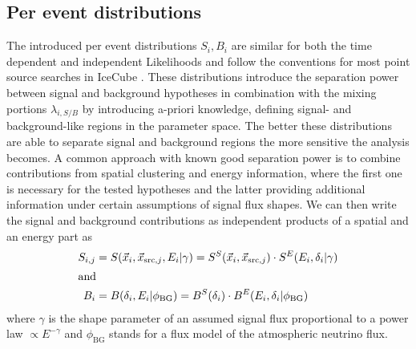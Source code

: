 \subsection{Per event distributions}
The introduced per event distributions $S_i, B_i$ are similar for both the time dependent and independent Likelihoods and follow the conventions for most point source searches in IceCube .
These distributions introduce the separation power between signal and background hypotheses in combination with the mixing portions $\lambda_{i,S/B}$ by introducing a-priori knowledge, defining signal- and background-like regions in the parameter space.
The better these distributions are able to separate signal and background regions the more sensitive the analysis becomes.
A common approach with known good separation power is to combine contributions from spatial clustering and energy information, where the first one is necessary for the tested hypotheses and the latter providing additional information under certain assumptions of signal flux shapes.
We can then write the signal and background contributions as independent products of a spatial and an energy part as
\begin{align}
  S_{i,j} &= S(\vec{x}_i, \vec{x}_{\mathrm{src},j}, E_i | \gamma)
    = S^S(\vec{x}_i, \vec{x}_{\mathrm{src},j})\cdot
      S^E(E_i, \delta_i | \gamma) \\
  \intertext{and}
  B_i &= B(\delta_i, E_i | \phi_\mathrm{BG})
    = B^S(\delta_i) \cdot B^E(E_i, \delta_i | \phi_\mathrm{BG})
\end{align}
where $\gamma$ is the shape parameter of an assumed signal flux proportional to a power law $\propto E^{-\gamma}$ and $\phi_\mathrm{BG}$ stands for a flux model of the atmospheric neutrino flux.

